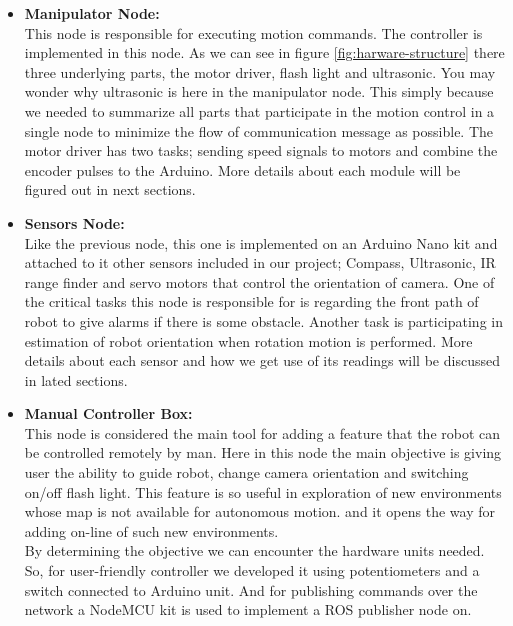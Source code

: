 \documentclass[12pt]{article}
\begin{document}
\begin{itemize}
	\item \textbf{Manipulator Node:}\\
	This node is responsible for executing motion commands. The controller is implemented in this node. As we can see in figure \ref{fig:harware-structure} there three underlying parts, the motor driver, flash light and ultrasonic. You may wonder why ultrasonic is here in the manipulator node. This simply because we needed to summarize all parts that participate in the motion control in a single node to minimize the flow of communication message as possible. The motor driver has two tasks; sending speed signals to motors and combine the encoder pulses to the Arduino. More details about each module will be figured out in next sections.
	
	\item \textbf{Sensors Node:}\\
	Like the previous node, this one is implemented on an Arduino Nano kit and attached to it other sensors included in our project; Compass, Ultrasonic, IR range finder and servo motors that control the orientation of camera. One of the critical tasks this node is responsible for is regarding the front path of robot to give alarms if there is some obstacle. Another task is participating in estimation of robot orientation when rotation motion is performed. More details about each sensor and how we get use of its readings will be discussed in lated sections. 
	
	\item \textbf{Manual Controller Box:}\\
	This node is considered the main tool for adding a feature that the robot can be controlled remotely by man. Here in this node the main objective is giving user the ability to guide robot, change camera orientation and switching on/off flash light. This feature is so useful in exploration of new environments whose map is not available for autonomous motion. and it opens the way for adding on-line of such new environments.\\
	By determining the objective we can encounter the hardware units needed. So, for user-friendly controller we developed it using potentiometers and a switch connected to Arduino unit. And for publishing commands over the network a NodeMCU kit is used to implement a ROS publisher node on. 
	

\end{itemize}
\end{document}
